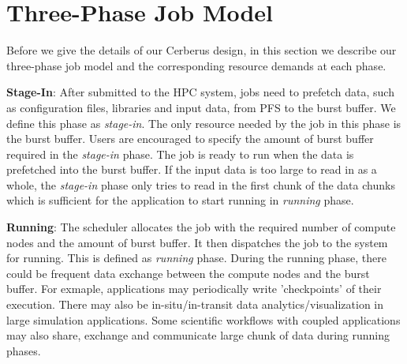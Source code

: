 \section{Three-Phase Job Model}
\label{Sec:Model}

Before we give the details of our Cerberus design, 
in this section we describe our three-phase job model 
and the corresponding resource demands at each phase. 
 
\textbf{Stage-In}: After submitted to the HPC system,
         jobs need to prefetch data, such as configuration files, libraries and input data,
         from PFS to the burst buffer. We define this phase as \textit{stage-in}.
         The only resource needed by the job in this phase is the burst buffer.
         Users are encouraged to specify the amount of burst buffer required in the \textit{stage-in} phase.
         The job is ready to run when the data is prefetched into the burst buffer.
         If the input data is too large to read in as a whole, the \textit{stage-in} phase
         only tries to read in the first chunk of the data chunks which is sufficient for
         the application to start running in \textit{running} phase.
 

\textbf{Running}: The scheduler allocates the job with the required
         number of compute nodes and the amount of burst buffer. 
         It then dispatches the job to the system for running.
         This is defined as \textit{running} phase.
         During the running phase, there could be frequent data exchange
         between the compute nodes and the burst buffer. For exmaple,
         applications may periodically write 'checkpoints' of their execution. 
         There may also be in-situ/in-transit data analytics/visualization in large simulation applications.
         Some scientific workflows with coupled applications may also share, exchange and communicate
         large chunk of data during running phases\cite{Romanus:CORR:15}.  

